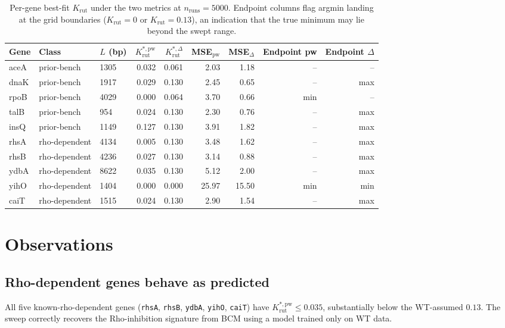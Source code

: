 \documentclass[11pt]{article}
\newcommand{\Krut}{K_{\text{rut}}}
\begin{document}
\begin{table}[h]
\centering
\small
\begin{tabular}{lllrrrrrr}
\toprule
Gene & Class & $L$ (bp) & $K^{*,\text{pw}}_{\text{rut}}$ & $K^{*,\Delta}_{\text{rut}}$ &
MSE$_{\text{pw}}$ & MSE$_{\Delta}$ & Endpoint pw & Endpoint $\Delta$ \\
\midrule
aceA & prior-bench   & 1305 & 0.032 & 0.061 & 2.03 & 1.18 & -- & -- \\
dnaK & prior-bench   & 1917 & 0.029 & 0.130 & 2.45 & 0.65 & -- & max \\
rpoB & prior-bench   & 4029 & 0.000 & 0.064 & 3.70 & 0.66 & min & -- \\
talB & prior-bench   &  954 & 0.024 & 0.130 & 2.30 & 0.76 & -- & max \\
insQ & prior-bench   & 1149 & 0.127 & 0.130 & 3.91 & 1.82 & -- & max \\
\addlinespace
rhsA & rho-dependent & 4134 & 0.005 & 0.130 & 3.48 & 1.62 & -- & max \\
rhsB & rho-dependent & 4236 & 0.027 & 0.130 & 3.14 & 0.88 & -- & max \\
ydbA & rho-dependent & 8622 & 0.035 & 0.130 & 5.12 & 2.00 & -- & max \\
yihO & rho-dependent & 1404 & 0.000 & 0.000 & 25.97 & 15.50 & min & min \\
caiT & rho-dependent & 1515 & 0.024 & 0.130 & 2.90 & 1.54 & -- & max \\
\bottomrule
\end{tabular}
\caption{Per-gene best-fit $\Krut$ under the two metrics at
$n_{\text{runs}}=5000$. Endpoint columns flag argmin landing at the
grid boundaries ($\Krut=0$ or $\Krut=0.13$), an indication that the
true minimum may lie beyond the swept range.}
\label{tab:panel}
\end{table}

\section{Observations}

\subsection{Rho-dependent genes behave as predicted}

All five known-rho-dependent genes (\texttt{rhsA}, \texttt{rhsB},
\texttt{ydbA}, \texttt{yihO}, \texttt{caiT}) have
$K^{*,\text{pw}}_{\text{rut}} \le 0.035$, substantially below the WT-assumed
$0.13$. The sweep correctly recovers the Rho-inhibition signature from
BCM using a model trained only on WT data.
\end{document}
